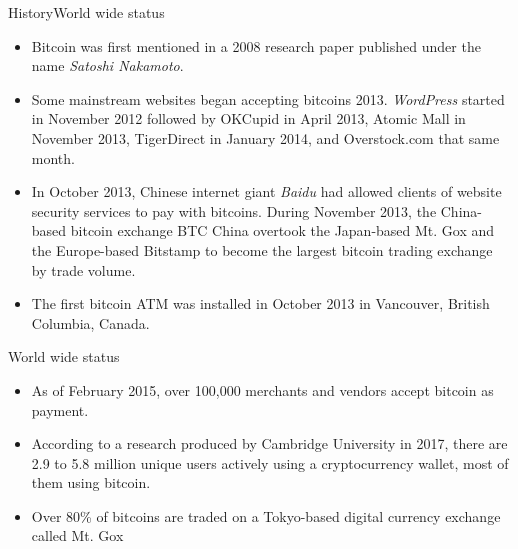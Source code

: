 \documentclass[handout]{beamer}
\begin{document}
\begin{frame}{History}{World wide status}

  \begin{itemize} 

  \item Bitcoin was first mentioned in a 2008 research paper published under the name \textit{Satoshi Nakamoto}. 

 \item  Some mainstream websites began accepting bitcoins 2013. \textit{WordPress} started in November 2012 followed by OKCupid in April 2013, Atomic Mall in November 2013, TigerDirect in January 2014, and Overstock.com that same month. 

 \item  In October 2013, Chinese internet giant \textit{Baidu} had allowed clients of website security services to pay with bitcoins. During November 2013, the China-based bitcoin exchange BTC China overtook the Japan-based Mt. Gox and the Europe-based Bitstamp to become the largest bitcoin trading exchange by trade volume. 
 
\item The first bitcoin ATM was installed in October 2013 in Vancouver, British Columbia, Canada.
  
  \end{itemize}
\end{frame}


\begin{frame}{World wide status}{}

  \begin{itemize}   
  \item As of February 2015, over 100,000 merchants and vendors accept bitcoin as payment.
  
  \item According to a research produced by Cambridge University in 2017, there are 2.9 to 5.8 million unique users actively using a cryptocurrency wallet, most of them using bitcoin.
  
  \item  Over 80\% of bitcoins are traded on a Tokyo-based digital currency exchange called Mt. Gox
  
     
  \end{itemize}
\end{frame}
\end{document}
